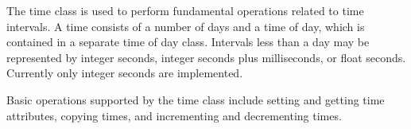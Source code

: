 
The time class is used to perform fundamental operations related to time 
intervals.  A time consists of a number of days and a time of day, which
is contained in a separate time of day class.  Intervals less than a day 
may be represented by integer seconds, integer seconds plus milliseconds, 
or float seconds.  Currently only integer seconds are implemented.

Basic operations supported by the time class include setting and getting
time attributes, copying times, and incrementing and decrementing times.









